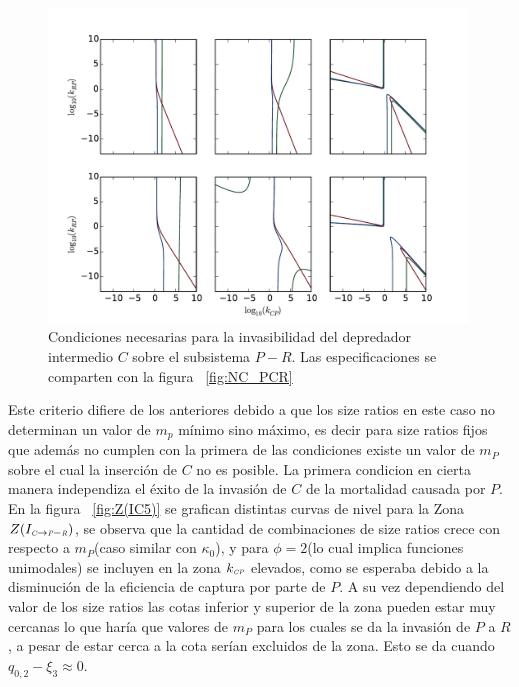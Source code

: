 \begin{figure}
  \centering
  \includegraphics[width = 0.99\textwidth]{./Plots/NecessityCPR.pdf}
  \caption[Condiciones Necesarias $C \to P-R$]{Condiciones necesarias para la invasibilidad del depredador intermedio $C$ sobre el subsistema $P-R$. Las especificaciones se comparten con la figura ~\ref{fig:NC_PCR}}
  \label{fig:NC_CPR}
\end{figure}


Este criterio difiere de los anteriores debido a que los size ratios en este caso no determinan un valor de $m_p$ m\'inimo sino m\'aximo, es decir para size ratios fijos que adem\'as no cumplen con la primera de las condiciones existe un valor de $m_P$ sobre el cual la inserci\'on de $C$ no es posible. La primera condicion en cierta manera independiza el \'exito de la invasi\'on de $C$ de la mortalidad causada por $P$. En la figura ~\ref{fig:Z(IC5)} se grafican distintas curvas de nivel para la Zona $Z(I_{\textit{\tiny C} \to \textit{\tiny P}-\textit{\tiny R}})$, se observa que la cantidad de combinaciones de size ratios crece con respecto a $m_P$(caso similar con $\kappa_0$), y para $\phi = 2$(lo cual implica funciones unimodales) se incluyen en la zona $k_{\textit{\tiny CP}}$ elevados, como se esperaba debido a la disminuci\'on de la eficiencia de captura por parte de $P$. A su vez dependiendo del valor de los size ratios las cotas inferior y superior de la zona pueden estar muy cercanas lo que har\'ia que valores de $m_P$ para los cuales se da la invasi\'on de $P$ a $R$ , a pesar de estar cerca a la cota ser\'ian excluidos de la zona. Esto se da cuando $ q_{0,2} - \xi_3 \approx 0$.


